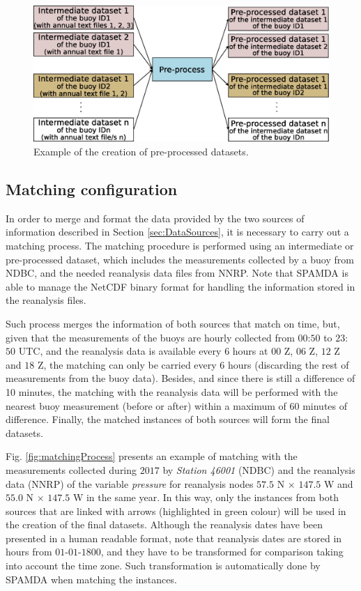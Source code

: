 \documentclass[review]{elsarticle}
\begin{document}
				\begin{figure}[ht!]
					\centering
					\includegraphics[scale=0.36]{figures/FigurePreprocess.eps}
					\caption{Example of the creation of pre-processed datasets.}
					\label{fig:preprocess}
				\end{figure}
				
				
			\subsection{Matching configuration}
			\label{sec:matching_conf}
			
				In order to merge and format the data provided by the two sources of information described in Section \ref{sec:DataSources}, it is necessary to carry out a matching process. The matching procedure is performed using an intermediate or pre-processed dataset, which includes the measurements collected by a buoy from NDBC, and the needed reanalysis data files from NNRP. Note that SPAMDA is able to manage the NetCDF binary format for handling the information stored in the reanalysis files.
				
				Such process merges the information of both sources that match on time, but, given that the measurements of the buoys are hourly collected from $00$:$50$ to $23$:$50$ UTC, and the reanalysis data is available every $6$ hours at $00$ Z, $06$ Z, $12$ Z and $18$ Z, the matching can only be carried every $6$ hours (discarding the rest of measurements from the buoy data). Besides, and since there is still a difference of 10 minutes, the matching with the reanalysis data will be performed with the nearest buoy measurement (before or after) within a maximum of 60 minutes of difference. Finally, the matched instances of both sources will form the final datasets.
				
				Fig. \ref{fig:matchingProcess} presents an example of matching with the measurements collected during $2017$ by \textit{Station 46001} (NDBC) and the reanalysis data (NNRP) of the variable \textit{pressure} for reanalysis nodes $57.5$ N $\times$ $147.5$ W and $55.0$ N $\times$ $147.5$ W in the same year. In this way, only the instances from both sources that are linked with arrows (highlighted in green colour) will be used in the creation of the final datasets. Although the reanalysis dates have been presented in a human readable format, note that reanalysis dates are stored in hours from $01$-$01$-$1800$, and they have to be transformed for comparison taking into account the time zone. Such transformation is automatically done by SPAMDA when matching the instances.
				
\end{document}
